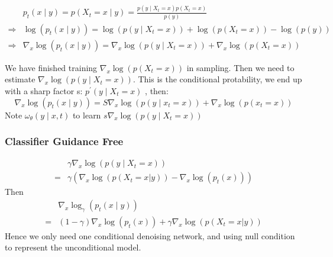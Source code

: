 \begin{equation}
    \begin{aligned}
    & p_{t}(x \mid y)=p\left(X_{t}=x \mid y\right)=\frac{p\left(y \mid X_{t}=x\right) p\left(X_{t}=x\right)}{p(y)} \\
    \Rightarrow & \log \left(p_{t}(x \mid y)\right)=\log \left(p\left(y \mid X_{t}=x\right)\right)+\log \left(p\left(X_{t}=x\right)\right)-\log (p(y)) \\
    \Rightarrow & \nabla_{x} \log \left(p_{t}(x \mid y)\right)=\nabla_{x} \log \left(p\left(y \mid X_{t}=x\right)\right)+\nabla_{x} \log \left(p\left(X_{t}=x\right)\right)
    \end{aligned}
\end{equation}
    
    
We have finished training  $\nabla_{x} \log \left(p\left(X_{t}=x\right)\right)$  in sampling. Then we need to estimate  $\nabla_{x} \log \left(p\left(y \mid X_{t}=x\right)\right)$. This is the conditional protability, we end up with a sharp factor s: $p^{\prime}\left(y \mid X_{t}=x\right)$ , then:
\begin{equation}
    \nabla_{x} \log \left(p_{t}(x \mid y)\right)=S \nabla_{x} \log \left(p\left(y \mid x_{t}=x\right)\right)+\nabla_{x} \log \left(p\left(x_{t}=x\right)\right)
\end{equation}
Note  $\omega_{\theta}(y \mid x, t)$  to learn  $s \nabla_{x} \log \left(p\left(y \mid X_{t}=x\right)\right)$ 

\subsubsection{Classifier Guidance Free}
\begin{equation}
    \begin{aligned}
        &\gamma \nabla_{x} \log \left(p\left(y \mid X_{t}=x\right)\right)\\
         =& \gamma\left(\nabla_x \log \left(p(X_t=x|y)\right) - \nabla_x \log \left(p_t(x)\right)\right)
    \end{aligned}
\end{equation}
Then 
\begin{equation}
    \begin{aligned}
        &\nabla_{x} \log_\gamma \left(p_{t}(x \mid y)\right)\\
        =&(1-\gamma)\nabla_x \log \left(p_t(x)\right) + \gamma\nabla_x \log \left(p(X_t=x|y)\right)
    \end{aligned}
\end{equation}
Hence we only need one conditional denoising network, and using null condition to represent the unconditional model.

